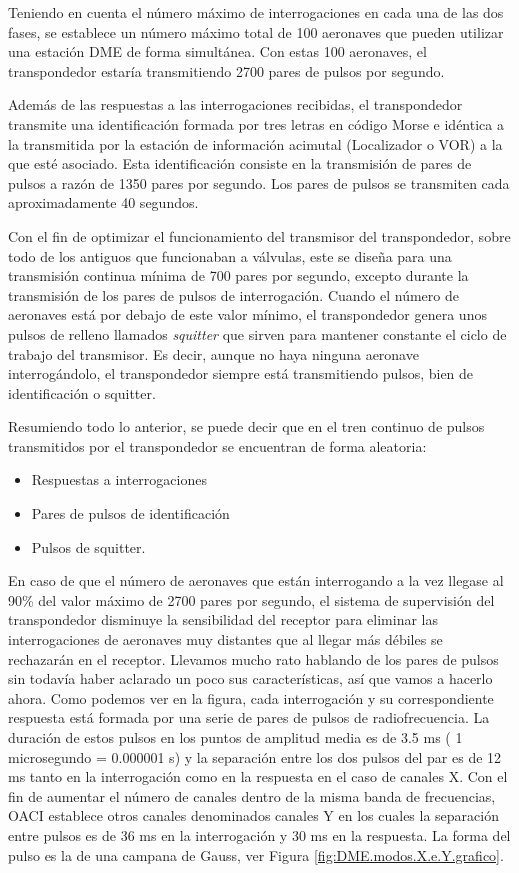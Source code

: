 Teniendo en cuenta el n\'umero m\'aximo de interrogaciones en cada una de las dos fases, se establece un n\'umero m\'aximo total de 100 aeronaves que pueden utilizar una estaci\'on DME de forma simult\'anea. Con estas 100 aeronaves, el transpondedor estar\'ia transmitiendo 2700 pares de pulsos por segundo.

Adem\'as de las respuestas a las interrogaciones recibidas, el transpondedor transmite una identificaci\'on formada por tres letras en c\'odigo Morse e id\'entica a la transmitida por la estaci\'on de informaci\'on acimutal (Localizador o VOR) a la que est\'e asociado. Esta identificaci\'on consiste en la transmisi\'on de pares de pulsos a raz\'on de 1350 pares por segundo. Los pares de pulsos se transmiten cada aproximadamente 40 segundos.

Con el fin de optimizar el funcionamiento del transmisor del transpondedor, sobre todo de los antiguos que funcionaban a v\'alvulas, este se dise\~na para una transmisi\'on continua m\'inima de 700 pares por segundo, excepto durante la transmisi\'on de los pares de pulsos de interrogaci\'on. Cuando el n\'umero de aeronaves est\'a por debajo de este valor m\'inimo, el transpondedor genera unos pulsos de relleno llamados \emph{squitter} que sirven para mantener constante el ciclo de trabajo del transmisor. Es decir, aunque no haya ninguna aeronave interrog\'andolo, el transpondedor siempre est\'a transmitiendo pulsos, bien de identificaci\'on o squitter.

Resumiendo todo lo anterior, se puede decir que en el tren continuo de pulsos transmitidos por el transpondedor se encuentran de forma aleatoria:

\begin{itemize}
	\item Respuestas a interrogaciones
	\item Pares de pulsos de identificaci\'on
	\item Pulsos de squitter.
\end{itemize}


En caso de que el n\'umero de aeronaves que est\'an interrogando a la vez llegase al 90\% del valor m\'aximo de 2700 pares por segundo, el sistema de supervisi\'on del transpondedor disminuye la sensibilidad del receptor para eliminar las interrogaciones de aeronaves muy distantes que al llegar m\'as d\'ebiles se rechazar\'an en el receptor. Llevamos mucho rato hablando de los pares de pulsos sin todav\'ia haber aclarado un poco sus caracter\'isticas, as\'i que vamos a hacerlo ahora. Como podemos ver en la figura, cada interrogaci\'on y su correspondiente respuesta est\'a formada por una serie de pares de pulsos de radiofrecuencia. La duraci\'on de estos pulsos en los puntos de amplitud media es de 3.5 ms ( 1 microsegundo = 0.000001 s) y la separaci\'on entre los dos pulsos del par es de 12 ms tanto en la interrogaci\'on como en la respuesta en el caso de canales X. Con el fin de aumentar el n\'umero de canales dentro de la misma banda de frecuencias, OACI establece otros canales denominados canales Y en los cuales la separaci\'on entre pulsos es de 36 ms en la interrogaci\'on y 30 ms en la respuesta. La forma del pulso es la de una campana de Gauss, ver Figura \ref{fig:DME.modos.X.e.Y.grafico}.

